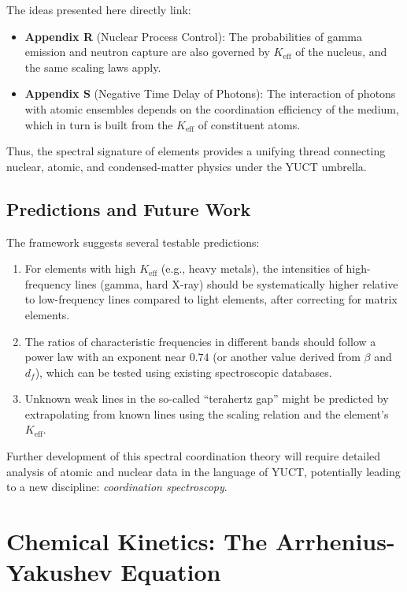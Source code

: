 \documentclass[12pt,a4paper]{article}
\theoremstyle{remark}
\begin{document}
	The ideas presented here directly link:
	\begin{itemize}
		\item \textbf{Appendix R} (Nuclear Process Control): The probabilities of gamma emission and neutron capture are also governed by \(K_{\mathrm{eff}}\) of the nucleus, and the same scaling laws apply.
		\item \textbf{Appendix S} (Negative Time Delay of Photons): The interaction of photons with atomic ensembles depends on the coordination efficiency of the medium, which in turn is built from the \(K_{\mathrm{eff}}\) of constituent atoms.
	\end{itemize}
	Thus, the spectral signature of elements provides a unifying thread connecting nuclear, atomic, and condensed-matter physics under the YUCT umbrella.
	
	\subsection{Predictions and Future Work}
	
	The framework suggests several testable predictions:
	\begin{enumerate}
		\item For elements with high \(K_{\mathrm{eff}}\) (e.g., heavy metals), the intensities of high-frequency lines (gamma, hard X-ray) should be systematically higher relative to low-frequency lines compared to light elements, after correcting for matrix elements.
		\item The ratios of characteristic frequencies in different bands should follow a power law with an exponent near \(0.74\) (or another value derived from \(\beta\) and \(d_f\)), which can be tested using existing spectroscopic databases.
		\item Unknown weak lines in the so-called “terahertz gap” might be predicted by extrapolating from known lines using the scaling relation and the element's \(K_{\mathrm{eff}}\).
	\end{enumerate}
	
	Further development of this spectral coordination theory will require detailed analysis of atomic and nuclear data in the language of YUCT, potentially leading to a new discipline: \emph{coordination spectroscopy}.
		
	\section{Chemical Kinetics: The Arrhenius-Yakushev Equation}
	\label{sec:kinetics}
	
\end{document}
